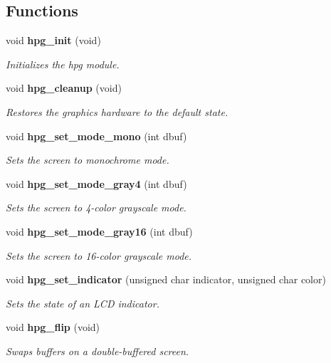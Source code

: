 \subsection*{Functions}
\begin{CompactItemize}
\item 
void {\bf hpg\_\-init} (void)
\begin{CompactList}\small\item\em Initializes the hpg module.\item\end{CompactList}\item 
void {\bf hpg\_\-cleanup} (void)
\begin{CompactList}\small\item\em Restores the graphics hardware to the default state.\item\end{CompactList}\item 
void {\bf hpg\_\-set\_\-mode\_\-mono} (int dbuf)
\begin{CompactList}\small\item\em Sets the screen to monochrome mode.\item\end{CompactList}\item 
void {\bf hpg\_\-set\_\-mode\_\-gray4} (int dbuf)
\begin{CompactList}\small\item\em Sets the screen to 4-color grayscale mode.\item\end{CompactList}\item 
void {\bf hpg\_\-set\_\-mode\_\-gray16} (int dbuf)
\begin{CompactList}\small\item\em Sets the screen to 16-color grayscale mode.\item\end{CompactList}\item 
void {\bf hpg\_\-set\_\-indicator} (unsigned char indicator, unsigned char color)
\begin{CompactList}\small\item\em Sets the state of an LCD indicator.\item\end{CompactList}\item 
void {\bf hpg\_\-flip} (void)
\begin{CompactList}\small\item\em Swaps buffers on a double-buffered screen.\item\end{CompactList}\item 

\end{CompactItemize}
